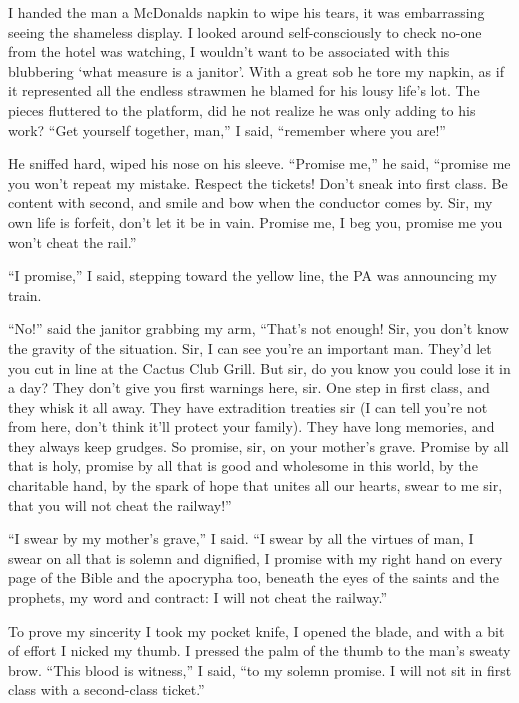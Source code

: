 \documentclass[oneside]{book}
\begin{document}
I handed the man a McDonalds napkin to wipe his tears, it was embarrassing seeing the shameless display.  I looked
around self-consciously to check no-one from the hotel was watching, I wouldn't want to be associated
with this blubbering `what measure is a janitor'.  With a great sob he tore my napkin, as if it represented all the endless strawmen
he blamed for his lousy life's lot.  The pieces fluttered to the platform, did he not realize he was only
adding to his work?  ``Get yourself together, man,'' I said, ``remember where you are!''

He sniffed hard, wiped his nose on his sleeve.  ``Promise me,'' he said, ``promise me you won't repeat
my mistake.  Respect the tickets!  Don't sneak into first class.  Be content with second, and smile and
bow when the conductor comes by.  Sir, my own life is forfeit, don't let it be in vain.  Promise me, I beg you,
promise me you won't cheat the rail.''

``I promise,'' I said, stepping toward the yellow line, the PA was announcing my train.

``No!'' said the janitor grabbing my arm, ``That's not enough!  Sir, you don't know the gravity of the situation.
Sir, I can see you're an important man.  They'd let you cut in line at the Cactus Club Grill.  But sir,
do you know you could lose it in a day?  They don't give you first warnings here, sir.  One step in
first class, and they whisk it all away.  They have extradition treaties sir (I can tell you're not from
here, don't think it'll protect your family).  They have long memories, and they always keep grudges.  So
promise, sir, on your mother's grave.  Promise by all that is holy, promise by all that is good and wholesome in
this world, by the charitable hand, by the spark of hope that unites all our hearts, swear to me sir, that you will
not cheat the railway!''

``I swear by my mother's grave,'' I said.  ``I swear by all the virtues of man, I swear on all that is solemn
and dignified, I promise with my right hand on every page of the Bible and the apocrypha too, beneath the eyes of
the saints and the prophets, my word and contract: I will not cheat the railway.''

To prove my sincerity I took my pocket knife, I opened the blade, and with a bit of effort I nicked
my thumb.  I pressed the palm of the thumb to the man's sweaty brow.  ``This blood is witness,'' I said, ``to my
solemn promise.  I will not sit in first class with a second-class ticket.''
\end{document}
